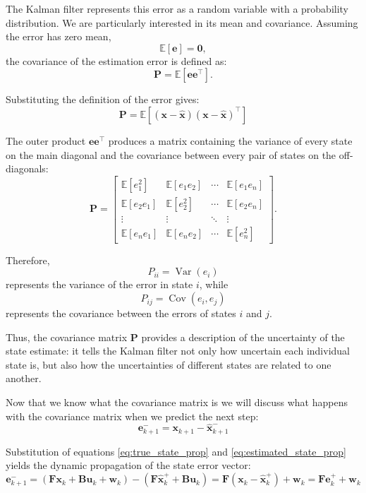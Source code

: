 \documentclass{article}
\begin{document}
	The Kalman filter represents this error as a random variable with a probability distribution. We are particularly interested in its mean and covariance. Assuming the error has zero mean,
	\[
	\mathbb{E}[\mathbf{e}] = \mathbf{0},
	\]
	the covariance of the estimation error is defined as:
	\[
	\mathbf{P} = \mathbb{E}\left[\mathbf{e}\mathbf{e}^\top\right].
	\]
	
	Substituting the definition of the error gives:
	\[
	\boxed{
		\mathbf{P} = \mathbb{E}\left[(\mathbf{x}-\hat{\mathbf{x}})(\mathbf{x}-\hat{\mathbf{x}})^\top\right]
	}
	\]
	
	The outer product $\mathbf{e}\mathbf{e}^\top$ produces a matrix containing the variance of every state on the main diagonal and the covariance between every pair of states on the off-diagonals:
	\[
	\mathbf{P} = 
	\begin{bmatrix}
		\mathbb{E}[e_1^2] & \mathbb{E}[e_1 e_2] & \cdots & \mathbb{E}[e_1 e_n] \\
		\mathbb{E}[e_2 e_1] & \mathbb{E}[e_2^2] & \cdots & \mathbb{E}[e_2 e_n] \\
		\vdots & \vdots & \ddots & \vdots \\
		\mathbb{E}[e_n e_1] & \mathbb{E}[e_n e_2] & \cdots & \mathbb{E}[e_n^2]
	\end{bmatrix}.
	\]
	
	Therefore,
	\[
	P_{ii} = \operatorname{Var}(e_i)
	\]
	represents the variance of the error in state $i$, while
	\[
	P_{ij} = \operatorname{Cov}(e_i, e_j)
	\]
	represents the covariance between the errors of states $i$ and $j$.
	
	Thus, the covariance matrix $\mathbf{P}$ provides a description of the uncertainty of the state estimate: it tells the Kalman filter not only how uncertain each individual state is, but also how the uncertainties of different states are related to one another.
	
	Now that we know what the covariance matrix is we will discuss what happens with the covariance matrix when we predict the next step:
	\[
	\mathbf{e}_{k+1}^- = \mathbf{x}_{k+1} - \hat{\mathbf{x}}_{k+1}^-
	\]
	
	Substitution of equations \ref{eq:true_state_prop} and \ref{eq:estimated_state_prop} yields the dynamic propagation of the state error vector:
	\[
	\mathbf{e}_{k+1}^- = (\mathbf{F} \mathbf{x}_{k} + \mathbf{B} \mathbf{u}_{k} + \mathbf{w}_{k}) - (\mathbf{F} \hat{\mathbf{x}}_{k}^+ + \mathbf{B} \mathbf{u}_{k}) = \mathbf{F} (\mathbf{x}_{k} - \hat{\mathbf{x}}_{k}^+) + \mathbf{w}_{k} = \mathbf{F} \mathbf{e}_{k}^+ + \mathbf{w}_{k}
	\]
	
\end{document}
